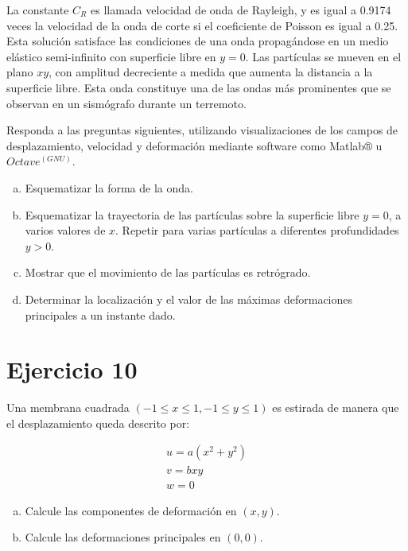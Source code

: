\documentclass[a4paper,10pt,twoside,final,spanish]{article}
\begin{document}
La constante $C_{R}$ es llamada velocidad de onda de Rayleigh, y es igual a 0.9174 veces la velocidad de la onda de corte si el coeficiente de Poisson es igual a 0.25. Esta solución satisface las condiciones de una onda propagándose en un medio elástico semi-infinito con superficie libre en $y=0$. Las partículas se mueven en el plano $xy$, con amplitud decreciente a medida que aumenta la distancia a la superficie libre. Esta onda constituye una de las ondas más prominentes que se observan en un sismógrafo 
durante un terremoto.

Responda a las preguntas siguientes, utilizando visualizaciones de los campos de desplazamiento, velocidad y deformación mediante software como Matlab® u $Octave^{(GNU)}$.

\begin{enumerate}[a.]
\item Esquematizar la forma de la onda.
\item Esquematizar la trayectoria de las partículas sobre la superficie libre $y=0$, a 
varios valores de $x$. Repetir para varias partículas a diferentes profundidades $y>0$.
\item Mostrar que el movimiento de las partículas es retrógrado.
\item Determinar la localización y el valor de las máximas deformaciones principales 
a un instante dado.
\end{enumerate}

\dotfill

\begin{quote}

\end{quote}

\section*{Ejercicio 10}

Una membrana cuadrada $(-1\leq x\leq 1,-1\leq y\leq1)$ es estirada de manera que el 
desplazamiento queda descrito por:

\[
\begin{array}{l}
u=a(x^{2}+y^{2}) \\
v=bxy            \\
w=0
\end{array}
\]

\begin{enumerate}[a.]
\item Calcule las componentes de deformación en $(x,y)$.
\item Calcule las deformaciones principales en $(0,0)$.
\end{enumerate}
\end{document}
